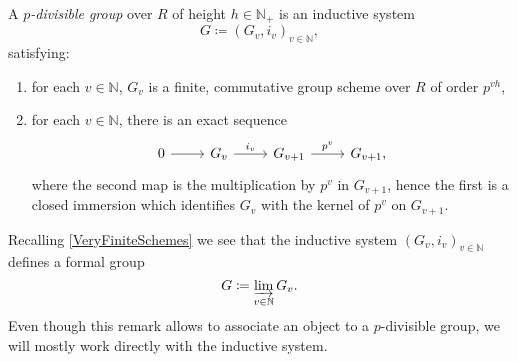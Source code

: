 \documentclass[../Main]{subfiles}
\begin{document}
\begin{defn}\label{defn:pDivGroupFormalSchemes}
	A {\em $p$-divisible group} over $R$ of height $h \in \mathbb{N}_+$ is an inductive system
	\begin{equation*}
	G \coloneqq \left(G_v, i_v\right)_{v \in \mathbb{N}}
	,\end{equation*} 
	satisfying:
	\begin{enumerate}
		\item for each $v \in \mathbb{N}$, $G_v$ is a finite, commutative group scheme over $R$
			of order $p^{v h}$,
		\item for each $v \in \mathbb{N}$, there is an exact sequence
			\begin{equation*}
			\begin{tikzcd}
				0 \arrow[r, "", rightarrow] &
				G_v \arrow[r, "i_v", rightarrow] &
				G_{v + 1} \arrow[r, "p^v", rightarrow] &
				G_{v + 1} 
			,\end{tikzcd}
			\end{equation*}
			where the second map is the multiplication by $p^v$ in $G_{v + 1}$,
			hence the first is a closed immersion which identifies
			$G_v$ with the kernel of $p^v$ on $G_{v+1}$.
	\end{enumerate}
\end{defn}


\begin{rem}[]
	Recalling \cref{VeryFiniteSchemes} we see that the inductive system 
	$\left( G_v, i_v \right)_{v \in \mathbb{N}}$ defines a formal group 
	\begin{equation*}
	G \coloneqq \varinjlim_{v \in \mathbb{N}} G_v
	.\end{equation*}
	Even though this remark allows to associate an object to a $p$-divisible 
	group, we will mostly work directly with the inductive system.
\end{rem}
\end{document}
